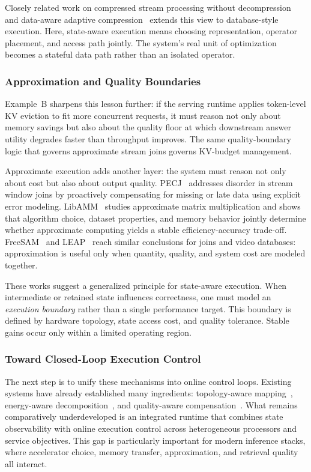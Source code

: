 \documentclass[acmsmall,screen,review]{acmart}
\begin{document}
Closely related work on compressed stream processing without decompression~\cite{zhang2023compressstreamdb} and data-aware adaptive compression~\cite{yu2025adaptivecompression} extends this view to database-style execution. Here, state-aware execution means choosing representation, operator placement, and access path jointly. The system's real unit of optimization becomes a stateful data path rather than an isolated operator.

\subsubsection{Approximation and Quality Boundaries}

Example~B sharpens this lesson further: if the serving runtime applies token-level KV eviction to fit more concurrent requests, it must reason not only about memory savings but also about the quality floor at which downstream answer utility degrades faster than throughput improves. The same quality-boundary logic that governs approximate stream joins governs KV-budget management.

Approximate execution adds another layer: the system must reason not only about cost but also about output quality. PECJ~\cite{zeng2024pecj} addresses disorder in stream window joins by proactively compensating for missing or late data using explicit error modeling. LibAMM~\cite{zeng2024libamm} studies approximate matrix multiplication and shows that algorithm choice, dataset properties, and memory behavior jointly determine whether approximate computing yields a stable efficiency-accuracy trade-off. FreeSAM~\cite{tang2025freesam} and LEAP~\cite{xu2024leap} reach similar conclusions for joins and video databases: approximation is useful only when quantity, quality, and system cost are modeled together.

These works suggest a generalized principle for state-aware execution. When intermediate or retained state influences correctness, one must model an \emph{execution boundary} rather than a single performance target. This boundary is defined by hardware topology, state access cost, and quality tolerance. Stable gains occur only within a limited operating region.

\subsubsection{Toward Closed-Loop Execution Control}

The next step is to unify these mechanisms into online control loops. Existing systems have already established many ingredients: topology-aware mapping~\cite{zhang2020finestream}, energy-aware decomposition~\cite{zeng2024cstream}, and quality-aware compensation~\cite{zeng2024pecj}. What remains comparatively underdeveloped is an integrated runtime that combines state observability with online execution control across heterogeneous processors and service objectives. This gap is particularly important for modern inference stacks, where accelerator choice, memory transfer, approximation, and retrieval quality all interact.
\end{document}
